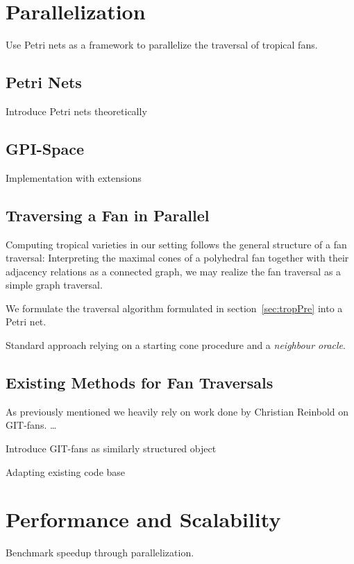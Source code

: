 \documentclass[
  paper=a4,
  titlepage,
  bibliography=totoc,
  listof=totoc,
  pagesize=pdftex
]{scrartcl}
\numberwithin{figure}{section}
\numberwithin{equation}{section}
\numberwithin{table}{section}
\theoremstyle{definition}
\numberwithin{definition}{section}
\begin{document}
\section{Parallelization}

Use Petri nets as a framework to parallelize the traversal of tropical fans.

\subsection{Petri Nets}

Introduce Petri nets theoretically

\subsection{GPI-Space}

Implementation with extensions

\subsection{Traversing a Fan in Parallel}

Computing tropical varieties in our setting follows the general structure of a fan
traversal: Interpreting the maximal cones of a polyhedral fan together with their
adjacency relations as a connected graph, we may realize the fan traversal as a simple
graph traversal.

We formulate the traversal algorithm formulated in section~\ref{sec:tropPre} into a Petri
net.

Standard approach relying on a starting cone procedure and a \emph{neighbour oracle}.

\subsection{Existing Methods for Fan Traversals}

As previously mentioned we heavily rely on work done by Christian Reinbold on GIT-fans.
\dots

Introduce GIT-fans as similarly structured object

Adapting existing code base

\section{Performance and Scalability}

Benchmark speedup through parallelization.
\end{document}
